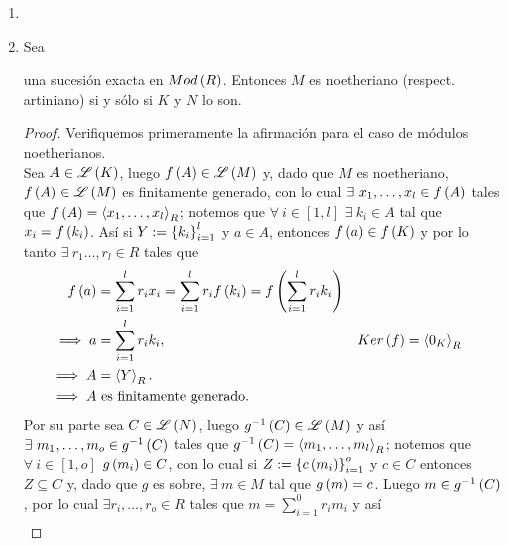 \documentclass{article}
\begin{document}
\begin{enumerate}[label=\textbf{Ej \arabic*.}]
\begin{proof}
	$\boxed{\text{(b)}\Rightarrow\text{(a)}}$ Sea $N_{1} \gneqq N_{2} \gneqq \cdots$ una cadena de submódulos de $M$. Considere $\mathfrak{F}=\arbtfam{N}{k}{\mathbb{N}}$. Entonces, por hipótesis, $\mathfrak{F}$ tiene elementos mínimos. Sea $N_{k}$ uno de dichos mínimos. Dado que $\mathfrak{F}$ es una cadena, $N_{k}=N_{k+t}$, para toda $t\in\mathbb{N}$. $\therefore M$ es artiniano.
\end{proof}
\item
\item Sea
\begin{center}
\end{center} 
una sucesión exacta en $Mod\left(R\right)$. Entonces $M$ es noetheriano (respect. artiniano) si y sólo si $K$ y $N$ lo son.
\begin{proof}
	Verifiquemos primeramente la afirmación para el caso de módulos noetherianos.\\
	\boxed{\implies} Sea $A\in\mathscr{L}\left(K\right)$, luego $f\left(A\right)\in\mathscr{L}\left(M\right)$ y, dado que $M$ es noetheriano, $f\left(A\right)\in\mathscr{L}\left(M\right)$ es finitamente generado, con lo cual $\exists\ x_1,\dotsc,x_l\in f\lrprth{A}$ tales que $f\left(A\right)=\left< x_1,\dotsc,x_l\right>_{R}$; notemos que $\forall\ i\in[1,l]$ $\exists\ k_i\in A$ tal que $x_i=f\left(k_i\right)$. Así si $Y:={\left\{{k}_{i}\right\}}_{i=1}^{l}$ y $a\in A$, entonces $f\left(a\right)\in f\left(K\right)$ y por lo tanto $\exists\ r_1\dots,r_l\in R$ tales que
	\begin{align*}
		f\left(a\right)&=\sum_{i=1}^{l}r_ix_i=\sum_{i=1}^{l}r_if\left(k_i\right)=f\left(\sum_{i=1}^{l}r_ik_i\right)\\
		\implies a&=\sum_{i=1}^{l}r_ik_i, && Ker\left(f\right)=\left< 0_K\right>_{R}\\
		\implies A&=\left< Y\right>_{R}.\\
		\implies A&\text{ es finitamente generado}.
	\end{align*} 
Por su parte sea $C\in\mathscr{L}\left(N\right)$, luego $g^{-1}\left(C\right)\in\mathscr{L}\left(M\right)$ y así $\exists\ m_1,\dotsc,m_o\in g^{-1}\left(C\right)$ tales que $g^{-1}\left(C\right)=\left< m_1,\dotsc,m_l\right>_{R}$; notemos que $\forall\ i\in[1,o]$ $g\left(m_i\right)\in C$, con lo cual  si $Z:=\left\{c\left(m_i\right)\right\}_{i=1}^{o}$ y $c\in C$ entonces $Z\subseteq C$ y, dado que $g$ es sobre, $\exists\ m\in M$ tal que $g\left(m\right)=c$. Luego $m\in g^{-1}\left(C\right)$, por lo cual $\exists r_i,\dotsc,r_o\in R$ tales que $m= \sum_{i=1}^{0}r_im_i$ y así
\begin{align*}

\end{align*}
\end{proof}
\end{enumerate}
\end{document}
